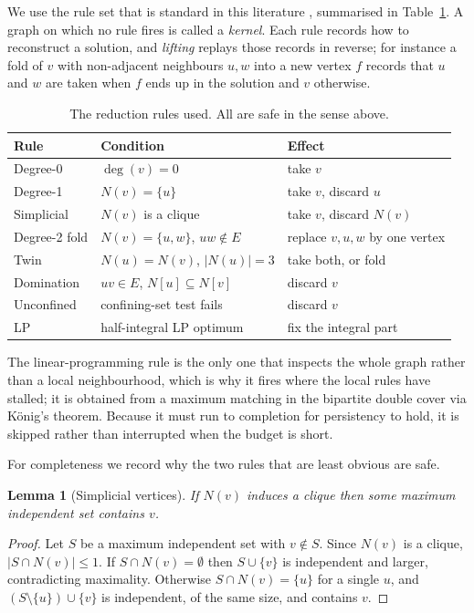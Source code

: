 \documentclass[preprint,12pt]{elsarticle}
\newtheorem{lemma}[theorem]{Lemma}
\theoremstyle{definition}
\begin{document}
We use the rule set that is standard in this literature
\cite{akiba2016,lamm2017,hespe2019}, summarised in Table~\ref{tab:rules}. A
graph on which no rule fires is called a \emph{kernel}. Each rule records how to
reconstruct a solution, and \emph{lifting} replays those records in reverse; for
instance a fold of $v$ with non-adjacent neighbours $u,w$ into a new vertex $f$
records that $u$ and $w$ are taken when $f$ ends up in the solution and $v$
otherwise.

\begin{table}[htbp]
\centering
\caption{The reduction rules used. All are safe in the sense above.}
\label{tab:rules}
\begin{tabular}{lll}
\toprule
Rule & Condition & Effect \\
\midrule
Degree-0 & $\deg(v)=0$ & take $v$ \\
Degree-1 & $N(v)=\{u\}$ & take $v$, discard $u$ \\
Simplicial & $N(v)$ is a clique & take $v$, discard $N(v)$ \\
Degree-2 fold & $N(v)=\{u,w\}$, $uw \notin E$ & replace $v,u,w$ by one vertex \\
Twin & $N(u)=N(v)$, $|N(u)|=3$ & take both, or fold \\
Domination & $uv \in E$, $N[u] \subseteq N[v]$ & discard $v$ \\
Unconfined \cite{xiao2017} & confining-set test fails & discard $v$ \\
LP \cite{nemhauser1975} & half-integral LP optimum & fix the integral part \\
\bottomrule
\end{tabular}
\end{table}

The linear-programming rule is the only one that inspects the whole graph rather
than a local neighbourhood, which is why it fires where the local rules have
stalled; it is obtained from a maximum matching in the bipartite double cover
via K\"onig's theorem. Because it must run to completion for persistency to
hold, it is skipped rather than interrupted when the budget is short.

For completeness we record why the two rules that are least obvious are safe.

\begin{lemma}[Simplicial vertices]
\label{lem:simplicial}
If $N(v)$ induces a clique then some maximum independent set contains $v$.
\end{lemma}

\begin{proof}
Let $S$ be a maximum independent set with $v \notin S$. Since $N(v)$ is a
clique, $|S \cap N(v)| \le 1$. If $S \cap N(v) = \emptyset$ then $S \cup \{v\}$
is independent and larger, contradicting maximality. Otherwise
$S \cap N(v) = \{u\}$ for a single $u$, and $(S \setminus \{u\}) \cup \{v\}$ is
independent, of the same size, and contains $v$.
\end{proof}
\end{document}
